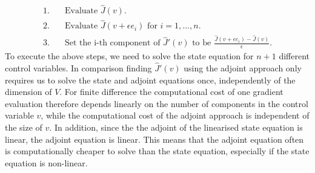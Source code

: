 \begin{align*}
1.\quad & \textrm{Evaluate $\hat J(v)$.}\\
2.\quad & \textrm{Evaluate $\hat J(v+\epsilon e_i)$ for $i=1,...,n$. }\\
3.\quad & \textrm{Set the i-th component of $\hat J'(v)$ to be $\frac{\hat J(v+\epsilon e_i)-\hat J(v)}{\epsilon}$.}
\end{align*}
To execute the above steps, we need to solve the state equation for $n+1$ different control variables. In comparison finding $\hat J'(v)$ using the adjoint approach only requires us to solve the state and adjoint equations once, independently of the dimension of $V$. For finite difference the computational cost of one gradient evaluation therefore depends linearly on the number of components in the control variable $v$, while the computational cost of the adjoint approach is independent of the size of $v$. In addition, since the the adjoint of the linearised state equation is linear, the adjoint equation is linear. This means that the adjoint equation often is computationally cheaper to solve than the state equation, especially if the state equation is non-linear. 
